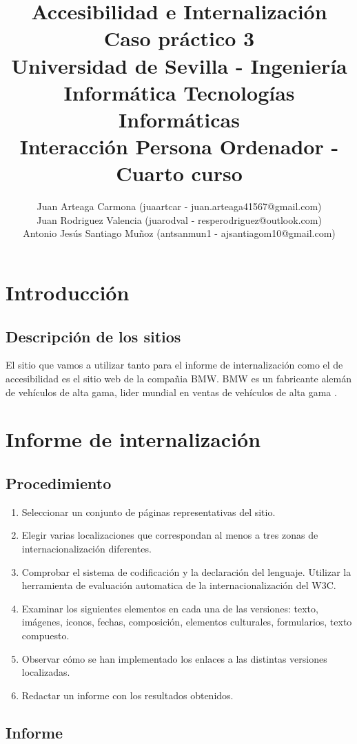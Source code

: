 \documentclass[a4paper,11pt]{article}
\title{
        \textbf{Accesibilidad e Internalización}\large\\
        \textbf{Caso práctico 3}\\
        \medskip
        Universidad de Sevilla - Ingeniería Informática Tecnologías Informáticas\\
        Interacción Persona Ordenador - Cuarto curso}
\author{Juan Arteaga Carmona (juaartcar - juan.arteaga41567@gmail.com)\\
        Juan Rodriguez Valencia (juarodval - resperodriguez@outlook.com)\\
        Antonio Jesús Santiago Muñoz (antsanmun1 - ajsantiagom10@gmail.com)\\
}
\begin{document}
\maketitle

\newpage
\tableofcontents
\listoffigures
\newpage


\section{Introducción}
\subsection{Descripción de los sitios}
El sitio que vamos a utilizar tanto para el informe de internalización como el de accesibilidad es el sitio web de la compañia BMW. BMW es un fabricante alemán de vehículos de alta gama, lider mundial en ventas de vehículos de alta gama \cite{bmwref3}.\\

\section{Informe de internalización}
\subsection{Procedimiento}
\begin{enumerate}
  \item Seleccionar un conjunto de páginas representativas del sitio.
  \item Elegir varias localizaciones que correspondan al menos a tres zonas de internacionalización diferentes.
  \item Comprobar el sistema de codificación y la declaración del lenguaje. Utilizar la herramienta de evaluación automatica de la internacionalización del W3C. \cite{w3cinter}
  \item Examinar los siguientes elementos en cada una de las versiones: texto, imágenes, iconos, fechas, composición, elementos culturales, formularios, texto compuesto.
  \item Observar cómo se han implementado los enlaces a las distintas versiones localizadas.
  \item Redactar un informe con los resultados obtenidos.
\end{enumerate}


\subsection{Informe}
\end{document}
